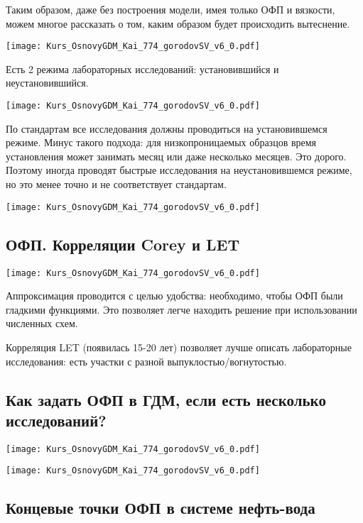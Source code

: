 \documentclass[main.tex]{subfiles}
\begin{document}
Таким образом, даже без построения модели, имея только ОФП и вязкости, можем многое рассказать о том, каким образом будет происходить вытеснение.

\texttt{[image: Kurs\_OsnovyGDM\_Kai\_774\_gorodovSV\_v6\_0.pdf]}

Есть 2 режима лабораторных исследований: установившийся и неустановившийся.

\texttt{[image: Kurs\_OsnovyGDM\_Kai\_774\_gorodovSV\_v6\_0.pdf]}

По стандартам все исследования должны проводиться на установившемся режиме.
Минус такого подхода: для низкопроницаемых образцов время установления может занимать месяц или даже несколько месяцев.
Это дорого.
Поэтому иногда проводят быстрые исследования на неустановившемся режиме, но это менее точно и не соответствует стандартам.

\texttt{[image: Kurs\_OsnovyGDM\_Kai\_774\_gorodovSV\_v6\_0.pdf]}

\subsection{ОФП. Корреляции Corey и LET}

\texttt{[image: Kurs\_OsnovyGDM\_Kai\_774\_gorodovSV\_v6\_0.pdf]}

Аппроксимация проводится с целью удобства: необходимо, чтобы ОФП были гладкими функциями.
Это позволяет легче находить решение при использовании численных схем.

Корреляция LET (появилась 15-20 лет) позволяет лучше описать лабораторные исследования: есть участки с разной выпуклостью/вогнутостью.

\subsection{Как задать ОФП в ГДМ, если есть несколько исследований?}

\texttt{[image: Kurs\_OsnovyGDM\_Kai\_774\_gorodovSV\_v6\_0.pdf]}



\texttt{[image: Kurs\_OsnovyGDM\_Kai\_774\_gorodovSV\_v6\_0.pdf]}

\subsection{Концевые точки ОФП в системе нефть-вода}
\end{document}
